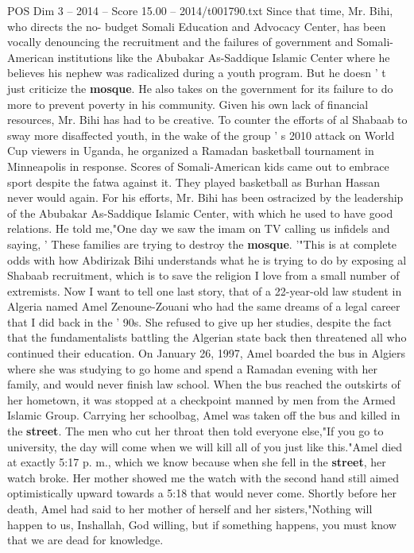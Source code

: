 \begin{textsample}{POS Dim 3 – 2014 – Score 15.00 – 2014/t001790.txt}
Since that time, Mr.
Bihi, who directs the no- budget Somali Education and Advocacy Center, has been vocally denouncing the recruitment and the failures of government and Somali-American institutions like the Abubakar As-Saddique Islamic Center where he believes his nephew was radicalized during a youth program.
But he doesn ' t just criticize the \textbf{mosque}.
He also takes on the government for its failure to do more to prevent poverty in his community.
Given his own lack of financial resources, Mr.
Bihi has had to be creative.
To counter the efforts of al Shabaab to sway more disaffected youth, in the wake of the group ' s 2010 attack on World Cup viewers in Uganda, he organized a Ramadan basketball tournament in Minneapolis in response.
Scores of Somali-American kids came out to embrace sport despite the fatwa against it.
They played basketball as Burhan Hassan never would again.
For his efforts, Mr.
Bihi has been ostracized by the leadership of the Abubakar As-Saddique Islamic Center, with which he used to have good relations.
He told me,"One day we saw the imam on TV calling us infidels and saying, ' These families are trying to destroy the \textbf{mosque}. '"This is at complete odds with how Abdirizak Bihi understands what he is trying to do by exposing al Shabaab recruitment, which is to save the religion I love from a small number of extremists.
Now I want to tell one last story, that of a 22-year-old law student in Algeria named Amel Zenoune-Zouani who had the same dreams of a legal career that I did back in the ' 90s.
She refused to give up her studies, despite the fact that the fundamentalists battling the Algerian state back then threatened all who continued their education.
On January 26, 1997, Amel boarded the bus in Algiers where she was studying to go home and spend a Ramadan evening with her family, and would never finish law school.
When the bus reached the outskirts of her hometown, it was stopped at a checkpoint manned by men from the Armed Islamic Group.
Carrying her schoolbag, Amel was taken off the bus and killed in the \textbf{street}.
The men who cut her throat then told everyone else,"If you go to university, the day will come when we will kill all of you just like this."Amel died at exactly 5:17 p. m., which we know because when she fell in the \textbf{street}, her watch broke.
Her mother showed me the watch with the second hand still aimed optimistically upward towards a 5:18 that would never come.
Shortly before her death, Amel had said to her mother of herself and her sisters,"Nothing will happen to us, Inshallah, God willing, but if something happens, you must know that we are dead for knowledge.

\end{textsample}
